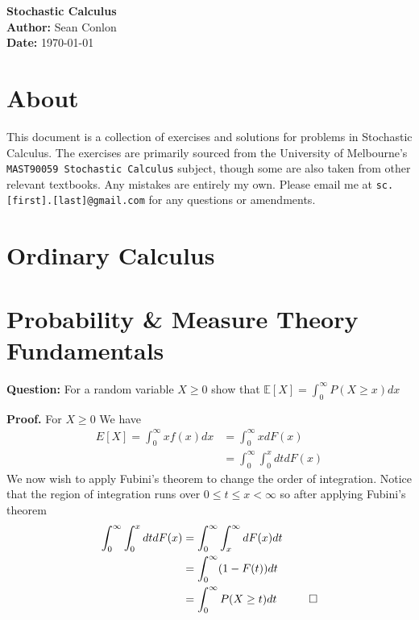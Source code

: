 \documentclass{article}
\begin{document}
\begin{titlepage}
    \centering
    {\Huge \textbf{Stochastic Calculus}}\\[1.5cm] %
    \textbf{Author:} Sean Conlon\\[1cm] %
    \textbf{Date:} \today\\[3cm] %
    
    \section*{About}
    This document is a collection of exercises and solutions for problems in Stochastic Calculus. The exercises are primarily sourced from the University of Melbourne's \texttt{MAST90059 Stochastic Calculus} subject, though some are also taken from other relevant textbooks. Any mistakes are entirely my own. Please email me at \texttt{sc.[first].[last]@gmail.com} for any questions or amendments.\\[2cm]

    \tableofcontents
    
\end{titlepage}

\newpage
\section{Ordinary Calculus}

\newpage
\section{Probability \& Measure Theory Fundamentals}

\begin{tcolorbox}[colframe=black,colback=gray!5,boxrule=0.5pt]
\textbf{Question:} For a random variable $X\geq0$ show that $\mathbb{E}[X] = \int_{0}^{\infty}P(X\geq x)dx$
\end{tcolorbox}
\textbf{Proof.} For $X\geq0$ We have 
\begin{align*}
    E[X] = \int_{0}^{\infty}xf(x)dx &= \int_{0}^{\infty} x dF(x) \\
    &= \int_{0}^{\infty}\int_{0}^{x}dtdF(x)
\end{align*}
We now wish to apply Fubini's theorem to change the order of integration. Notice that the region of integration runs over $0\leq t\leq x<\infty$ so after applying Fubini's theorem
\begin{align*}
    \int_{0}^{\infty}\int_{0}^{x}dtdF(x) &= \int_{0}^{\infty}\int_{x}^{\infty}dF(x)dt \\
    &=\int_{0}^{\infty}(1 - F(t))dt \\
    &= \int_{0}^{\infty} P(X\geq t)dt \hspace{10mm}
    \square\\
\end{align*}
\end{document}
